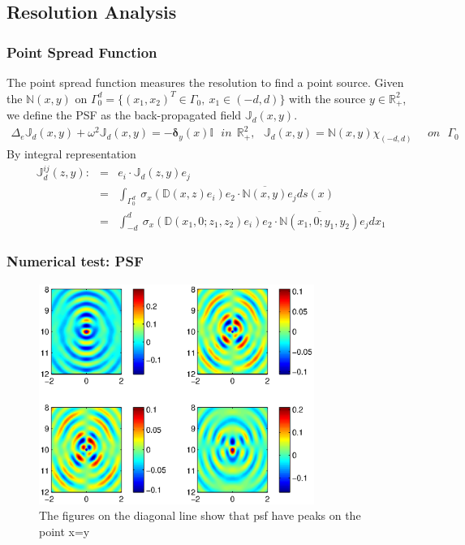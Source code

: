 \documentclass[cjk,8pt]{beamer}
\newcommand{\R}{\mathbb{R}}
\newcommand{\de}{\delta}
\newcommand{\De}{\Delta}
\newcommand{\N}{\mathbb{N}}
\newcommand{\D}{\mathbb{D}}
\newcommand{\J}{\mathbb{J}}
\newcommand{\ben}{\begin{eqnarray*}}
\newcommand{\een}{\end{eqnarray*}}
\begin{document}
\begin{CJK*}{GBK}{kai}
\section{Resolution Analysis}
\begin{frame}
\frametitle{Point Spread Function}
The point spread function measures the resolution to find a point source. Given the $\N(x,y)$ on $\Gamma_0^d=\{(x_1,x_2)^T\in\Gamma_0, \  x_1\in(-d,d)\}$ with the source $y\in \R_+^2$, we define the PSF as the back-propagated field $\J_d(x,y)$.
\ben
\De_e \J_d(x,y) + \omega^2 \J_d(x,y) = -\mathbf{\de}_y(x) \mathbb{I}  \ \ \ in \ \  \R^2_+ , \label{eq_d1} \ \ \
  \J_d(x,y) = \N(x,y)\chi_{(-d,d)} \ \ \ \ \ \ on \ \ \ \Gamma_0
\een
By integral representation
\ben
\J^{ij}_d(z,y):&=&e_i\cdot \J_d(z,y) e_j \\
&=&\int_{\Gamma_0^d} \ \sigma_x(\D(x,z)e_i)e_2\cdot\overline{\N(x,y)}e_j ds(x) \\ \label{fullpsf}
&=&\int_{-d}^d \ \sigma_x(\D(x_1,0;z_1,z_2)e_i)e_2\cdot\overline{\N(x_1,0;y_1,y_2)}e_j dx_1
\een
\end{frame}

\begin{frame}
\frametitle{Numerical test: PSF}
\begin{figure}[h]
  \centering
  \includegraphics[width=0.8\textwidth]{./psf/J.eps}
  \caption{The figures on the diagonal line show that psf have peaks on the point x=y}\label{fig_wgout_ex1}
\end{figure}
\end{frame}


\end{CJK*}
\end{document}
